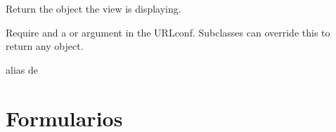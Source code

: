 \documentclass[letterpaper,10pt,spanish]{sphinxmanual}
\begin{document}
\begin{fulllineitems}
\begin{fulllineitems}
\pysigstartsignatures
{}
\pysigstopsignatures
\sphinxAtStartPar
Return the object the view is displaying.

\sphinxAtStartPar
Require  and a  or  argument in the URLconf.
Subclasses can override this to return any object.

\end{fulllineitems}



\begin{fulllineitems}

\pysigstartsignatures
{}
\pysigstopsignatures
\sphinxAtStartPar
alias de 

\end{fulllineitems}



\begin{fulllineitems}

\pysigstartsignatures
{}
\pysigstopsignatures
\end{fulllineitems}



\begin{fulllineitems}

\pysigstartsignatures
{}
\pysigstopsignatures
\end{fulllineitems}


\end{fulllineitems}



\section{Formularios}
\label{\detokenize{supervisores:formularios}}
\end{document}
